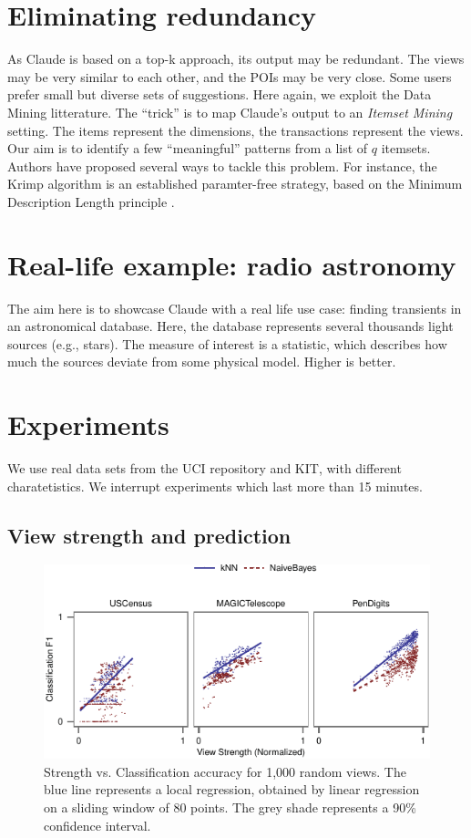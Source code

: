 \section{Eliminating redundancy}
As Claude is based on a top-k approach, its output may be redundant.  The views
may be very similar to each other, and the POIs may be very close.  Some users
prefer small but diverse sets of suggestions. Here again, we exploit the Data
Mining litterature. The ``trick'' is to map Claude's output to an \emph{Itemset
Mining} setting.  The items represent the dimensions, the transactions
represent the views. Our aim is to identify a few ``meaningful'' patterns from
a list of $q$ itemsets. Authors have proposed several ways to tackle this
problem. For instance, the Krimp algorithm is an established paramter-free
strategy, based on the Minimum Description Length principle
\cite{vreeken2011krimp}.


\section{Real-life example: radio astronomy}
The aim here is to showcase Claude with a real life use case: finding
transients in an astronomical database. Here, the database represents several
thousands light sources (e.g., stars). The measure of interest is a statistic,
which describes how much the sources deviate from some physical model. Higher
is better.


\section{Experiments}

We use real data sets from the UCI repository and KIT, with different
charatetistics. We interrupt experiments which last more than 15 minutes.

\subsection{View strength and prediction}

\begin{figure}[t!]
\centering
\includegraphics[width=\columnwidth]{plots/compare-strength-f1}
\caption{Strength vs. Classification accuracy for 1,000 random views. The blue
    line represents a local regression, obtained by linear regression on a
    sliding window of 80 points. The grey shade represents a 90\% confidence
interval.}
\label{pic:strength-vs-f1}
\end{figure}

